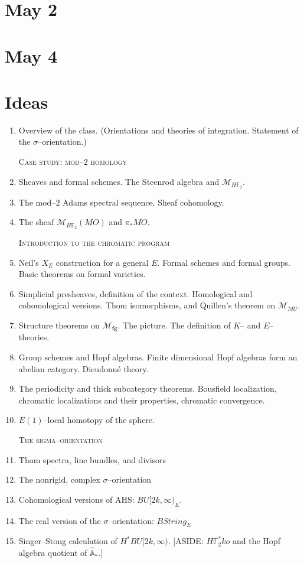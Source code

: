 \documentclass{article}
\newcommand{\F}{\mathbb F}
\newcommand{\A}{\widehat{\mathbb{A}}}
\newcommand{\<}{\langle}
\renewcommand{\>}{\rangle}
\newcommand{\context}[1]{\mathcal{M}_{#1}}
\newcommand{\moduli}[1]{\mathcal{M}_{\mathbf{#1}}}
\newcommand{\String}{\mathit{String}}
\newcommand{\MU}{\mathit{MU}}
\numberwithin{equation}{section}
\theoremstyle{plain}
\theoremstyle{definition}
\theoremstyle{remark}
\begin{document}
\section*{May 2}

\section*{May 4}




\newpage

\section*{Ideas}
\begin{enumerate}
\item Overview of the class. (Orientations and theories of integration. Statement of the $\sigma$--orientation.)

\textsc{Case study: mod--$2$ homology}
\item Sheaves and formal schemes. The Steenrod algebra and $\context{H\F_2}$.
\item The mod--$2$ Adams spectral sequence. Sheaf cohomology. 
\item The sheaf $\context{H\F_2}(MO)$ and $\pi_* MO$.

\textsc{Introduction to the chromatic program}

\item Neil's $X_E$ construction for a general $E$. Formal schemes and formal groups. Basic theorems on formal varieties.
\item Simplicial presheaves, definition of the context. Homological and cohomological versions. Thom isomorphisms, and Quillen's theorem on $\context{\MU}$.
\item Structure theorems on $\moduli{fg}$. The picture. The definition of $K$-- and $E$--theories.
\item Group schemes and Hopf algebras. Finite dimensional Hopf algebras form an abelian category. Dieudonn\'e theory.
\item The periodicity and thick subcategory theorems. Bousfield localization, chromatic localizations and their properties, chromatic convergence.
\item $E(1)$--local homotopy of the sphere.

\textsc{The sigma--orientation}

\item Thom spectra, line bundles, and divisors
\item The nonrigid, complex $\sigma$--orientation
\item Cohomological versions of AHS: $BU[2k, \infty)_E$.
\item The real version of the $\sigma$--orientation: $B\String_E$
\item Singer--Stong calculation of $H^* BU[2k, \infty)$. [ASIDE: $H\F_2^* ko$ and the Hopf algebra quotient of $\A_*$.]


\end{enumerate}
\end{document}
